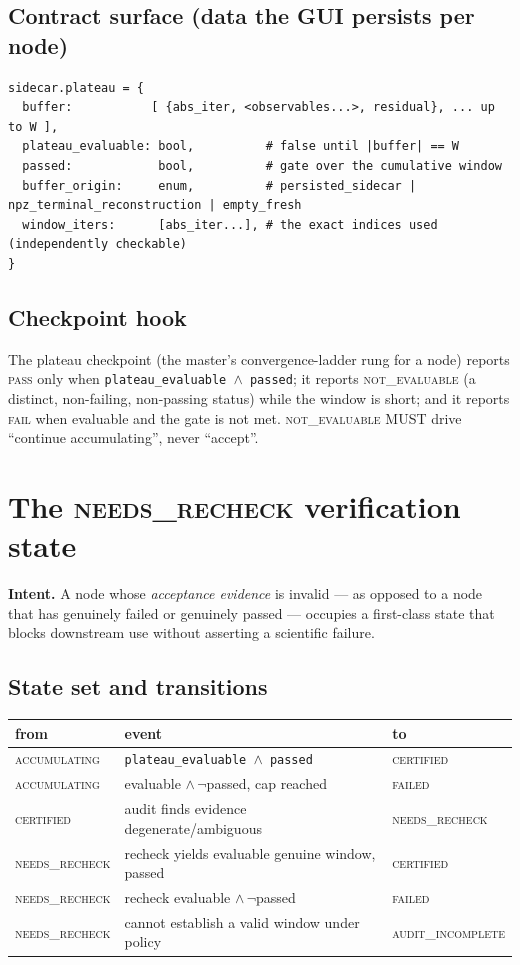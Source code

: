 \documentclass[11pt]{article}
\newcommand{\state}[1]{\textsc{#1}}
\newcommand{\code}[1]{\texttt{#1}}
\begin{document}
\subsection{Contract surface (data the GUI persists per node)}
\begin{lstlisting}
sidecar.plateau = {
  buffer:           [ {abs_iter, <observables...>, residual}, ... up to W ],
  plateau_evaluable: bool,          # false until |buffer| == W
  passed:            bool,          # gate over the cumulative window
  buffer_origin:     enum,          # persisted_sidecar | npz_terminal_reconstruction | empty_fresh
  window_iters:      [abs_iter...], # the exact indices used (independently checkable)
}
\end{lstlisting}

\subsection{Checkpoint hook}
The plateau checkpoint (the master's convergence-ladder rung for a node) reports \state{pass} only when
\code{plateau\_evaluable $\wedge$ passed}; it reports \state{not\_evaluable} (a distinct, non-failing,
non-passing status) while the window is short; and it reports \state{fail} when evaluable and the gate is
not met. \state{not\_evaluable} MUST drive ``continue accumulating'', never ``accept''.

\section{The \state{needs\_recheck} verification state}
\textbf{Intent.} A node whose \emph{acceptance evidence} is invalid --- as opposed to a node that has
genuinely failed or genuinely passed --- occupies a first-class state that blocks downstream use without
asserting a scientific failure.

\subsection{State set and transitions}
\begin{center}\small
\begin{tabular}{lll}\toprule
from & event & to \\ \midrule
\state{accumulating} & \code{plateau\_evaluable $\wedge$ passed} & \state{certified} \\
\state{accumulating} & evaluable $\wedge\,\neg$passed, cap reached & \state{failed} \\
\state{certified} & audit finds evidence degenerate/ambiguous & \state{needs\_recheck} \\
\state{needs\_recheck} & recheck yields evaluable genuine window, passed & \state{certified} \\
\state{needs\_recheck} & recheck evaluable $\wedge\,\neg$passed & \state{failed} \\
\state{needs\_recheck} & cannot establish a valid window under policy & \state{audit\_incomplete} \\
\bottomrule\end{tabular}
\end{center}
\end{document}
